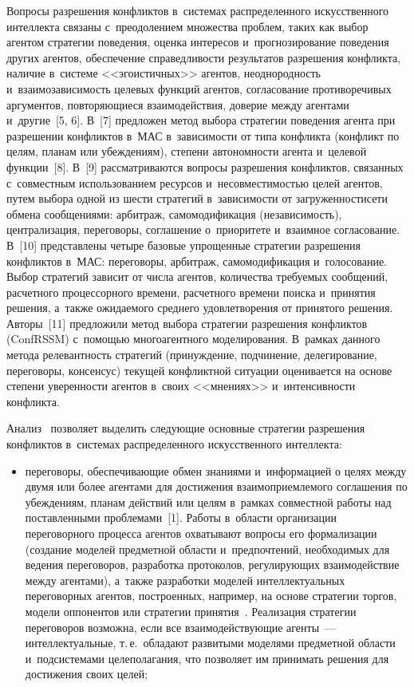\begin{multicols}{2}
  Вопросы разрешения конфликтов в~сис\-те\-мах распределенного 
искусственного интеллекта связаны с~преодолением множества проб\-лем, 
таких как выбор агентом стратегии поведения, оценка интересов 
и~прогнозирование поведения других агентов, обеспечение спра\-вед\-ли\-вости 
результатов разрешения конфликта, наличие в~сис\-те\-ме <<эгоистичных>> 
агентов, неоднородность и~взаимозависимость целевых функций агентов, 
согласование противоречивых аргументов, повторяющиеся взаимодействия, 
доверие между агентами и~другие~[5, 6]. В~[7] предложен метод выбора 
стратегии поведения агента при разрешении конфликтов в~МАС 
в~зависимости от типа конфликта (конфликт по целям, планам 
или убеж\-де\-ни\-ям), степени автономности агента и~целевой функции~[8]. В~[9] 
рассматриваются вопросы разрешения конфликтов, связанных с~совместным 
использованием ресурсов и~не\-со\-вмес\-ти\-мостью целей агентов, путем выбора 
одной из шести стратегий в~зависимости от загруженности\linebreak сети обмена 
сообщениями: арбитраж, самомодификация (независимость), централизация, 
переговоры, соглашение о~приоритете и~взаимное согласование. В~[10] 
представлены четыре базовые \mbox{упрощенные} стратегии разрешения конфликтов 
в~МАС: переговоры, арбитраж, самомодификация и~голосование. Выбор 
стратегий зависит от числа агентов, количества требуемых сообщений, 
расчетного процессорного времени, расчетного времени поиска и~принятия 
решения, а~также ожидаемого сред\-не\-го удовлетворения от принятого решения. 
Авторы~[11] предложили метод выбора стратегии разрешения конфликтов 
(ConfRSSM) с~по\-мощью многоагентного моделирования. В~рамках данного 
метода релевантность стратегий (принуждение, подчинение, делегирование, 
переговоры, консенсус) текущей конфликтной ситуации оценивается на основе 
степени уве\-рен\-ности агентов в~своих <<мнениях>> и~интенсивности 
конфликта.
  
  Анализ~\cite{5-l, 6-l, 7-l, 8-l, 9-l, 10-l, 11-l} позволяет выделить следующие 
основные стратегии разрешения конфликтов в~сис\-те\-мах распределенного 
искусственного ин\-тел\-лекта: 
  \begin{itemize}
  \item  переговоры, обеспечивающие обмен знаниями и~информацией о целях 
между двумя или более агентами для достижения взаимоприемлемого 
соглашения по убеждениям, планам действий или целям в~рамках совместной 
работы над поставленными проб\-ле\-ма\-ми~[1]. Работы в~об\-ласти 
организации переговорного процесса агентов охватывают вопросы его 
формализации (создание моделей предметной об\-ласти и~предпочтений, 
необходимых для ведения переговоров, разработка протоколов, ре\-гу\-ли\-ру\-ющих 
взаимодействие между агентами), а~так\-же разработки моделей 
интеллектуальных переговорных агентов, построенных, например, на основе 
стратегии торгов, модели оппонентов или стратегии принятия~\cite{6-l}. 
Реализация стратегии переговоров возможна, если все взаимодействующие 
агенты~--- интеллектуальные, т.\,е.\ обладают развитыми моделями предметной 
области и~под\-сис\-те\-ма\-ми целеполагания, что позволяет им принимать решения 
для достижения своих целей;



\end{itemize}
\end{multicols}
